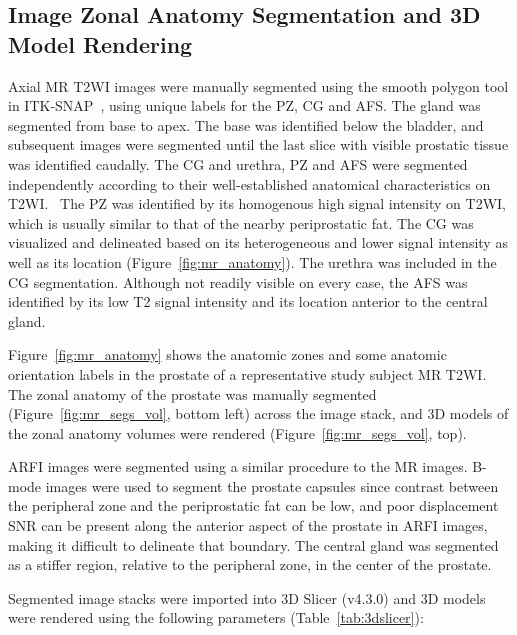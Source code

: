 \subsection{Image Zonal Anatomy Segmentation and 3D Model Rendering}
Axial MR T2WI images were manually segmented using the smooth polygon tool in
ITK-SNAP~\cite{Yushkevich2006}, using unique labels for the PZ, CG and AFS. The
gland was segmented from base to apex.  The base was identified below the
bladder, and subsequent images were segmented until the last slice with visible
prostatic tissue was identified caudally. The CG and urethra, PZ and AFS were
segmented independently according to their well-established anatomical
characteristics on
T2WI.~\cite{Barentsz2012,Jung2012,Poon1985,Hricak2007,Bonekamp2011} The PZ was
identified by its homogenous high signal intensity on T2WI, which is usually
similar to that of the nearby periprostatic fat. The CG was visualized and
delineated based on its heterogeneous and lower signal intensity as well as its
location (Figure~\ref{fig:mr_anatomy}). The urethra was included in the CG
segmentation. Although not readily visible on every case, the AFS was
identified by its low T2 signal intensity and its location anterior to the
central gland. 

Figure~\ref{fig:mr_anatomy} shows the anatomic zones and some anatomic
orientation labels in the prostate of a representative study subject MR T2WI.  The
zonal anatomy of the prostate was manually segmented
(Figure~\ref{fig:mr_segs_vol}, bottom left) across the image stack, and 3D
models of the zonal anatomy volumes were rendered
(Figure~\ref{fig:mr_segs_vol}, top).





ARFI images were segmented using a similar procedure to the MR images.  B-mode
images were used to segment the prostate capsules since contrast between the
peripheral zone and the periprostatic fat can be low, and poor displacement SNR
can be present along the anterior aspect of the prostate in ARFI images, making
it difficult to delineate that boundary.  The central gland was segmented as a
stiffer region, relative to the peripheral zone, in the center of the prostate.



Segmented image stacks were imported into 3D Slicer (v4.3.0) and 3D
models were rendered using the following parameters (Table~\ref{tab:3dslicer}):

